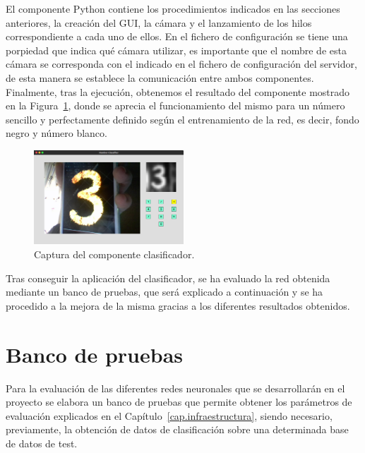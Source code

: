 El componente Python contiene los procedimientos indicados en las secciones anteriores, la creación del GUI, la cámara y el lanzamiento de los hilos correspondiente a cada uno de ellos. En el fichero de configuración se tiene una porpiedad que indica qué cámara utilizar, es importante que el nombre de esta cámara se corresponda con el indicado en el fichero de configuración del servidor, de esta manera se establece la comunicación entre ambos componentes.\\

Finalmente, tras la ejecución, obtenemos el resultado del componente mostrado en la Figura~\ref{fig.componente1}, donde se aprecia el funcionamiento del mismo para un número sencillo y perfectamente definido según el entrenamiento de la red, es decir, fondo negro y número blanco.

\begin{figure}[H]
	\begin{center}
		\includegraphics[width=0.5\textwidth]{figures/componente1}
		\caption{Captura del componente clasificador.}
		\label{fig.componente1}
	\end{center}
\end{figure}

Tras conseguir la aplicación del clasificador, se ha evaluado la red obtenida mediante un banco de pruebas, que será explicado a continuación y se ha procedido a la mejora de la misma gracias a los diferentes resultados obtenidos.\\

\section{Banco de pruebas} \label{sec.banco}
Para la evaluación de las diferentes redes neuronales que se desarrollarán en el proyecto se elabora un banco de pruebas que permite obtener los parámetros de evaluación explicados en el Capítulo~\ref{cap.infraestructura}, siendo necesario, previamente, la obtención de datos de clasificación sobre una determinada base de datos de test.\\

